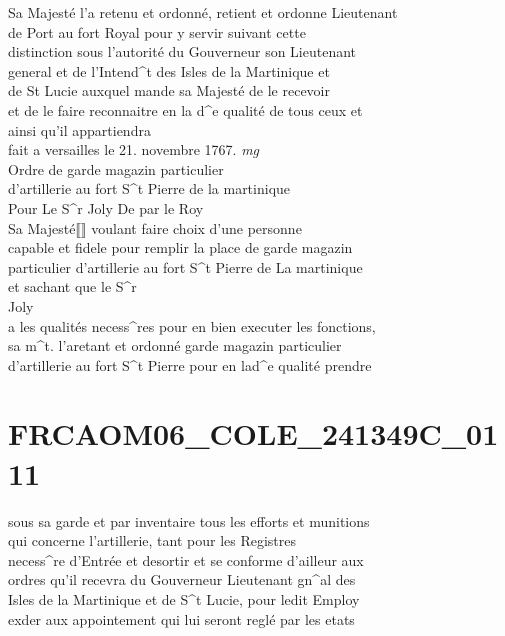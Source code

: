 \documentclass{article}
\begin{document}
\begin{pages}
Sa Majesté l'a retenu et ordonné, retient et ordonne Lieutenant\\
de Port au fort Royal pour y servir suivant cette\\
distinction sous l'autorité du Gouverneur son Lieutenant\\
general et de l'Intend\^{}t des Isles de la Martinique et\\
de St Lucie auxquel mande sa Majesté de le recevoir\\
et de le faire reconnaitre en la d\^{}e qualité de tous ceux et\\
ainsi qu'il appartiendra\\
fait a versailles le 21. novembre 1767.
\pend
\vspace{0.5cm}\noindent
\textit{mg}
\footnotesize \\
Ordre de garde magazin particulier\\
d'artillerie au fort S\^{}t Pierre de la martinique\\
Pour Le S\^{}r Joly
\normalsize \pstart
De par le Roy\\
Sa Majesté⟦⟧ voulant faire choix d'une personne\\
capable et fidele pour remplir la place de garde magazin\\
particulier d'artillerie au fort S\^{}t Pierre de La martinique\\
et sachant que le S\^{}r\\
Joly\\
a les qualités necess\^{}res pour en bien executer les fonctions,\\
sa m\^{}t. l'aretant et ordonné garde magazin particulier\\
d'artillerie au fort S\^{}t Pierre pour en lad\^{}e qualité prendre
\pend
\endnumbering\beginnumbering\section{FRCAOM06\_COLE\_241349C\_0111}\pstart
sous sa garde et par inventaire tous les efforts et munitions\\
qui concerne l'artillerie, tant pour les Registres\\
necess\^{}re d'Entrée et desortir et se conforme d'ailleur aux\\
ordres qu'il recevra du Gouverneur Lieutenant gn\^{}al des\\
Isles de la Martinique et de S\^{}t Lucie, pour ledit Employ\\
exder aux appointement qui lui seront reglé par les etats\\

\end{pages}
\end{document}
